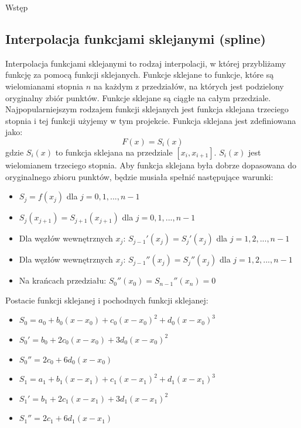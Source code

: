 \documentclass{article}
\begin{document}
\begin{section}{Wstęp}
  \subsection{Interpolacja funkcjami sklejanymi (spline)}
  Interpolacja funkcjami sklejanymi to rodzaj interpolacji, w której przybliżamy funkcję za pomocą funkcji sklejanych.
  Funkcje sklejane to funkcje, które są wielomianami stopnia $n$ na każdym z przedziałów, na których jest podzielony
  oryginalny zbiór punktów. Funkcje sklejane są ciągłe na całym przedziale.
  Najpopularniejszym rodzajem funkcji sklejanych jest funkcja sklejana trzeciego stopnia i tej funkcji użyjemy w tym
  projekcie. Funkcja sklejana jest zdefiniowana jako:
  \begin{equation}
    F(x) = S_{i}(x)
  \end{equation}
  gdzie $S_{i}(x)$ to funkcja sklejana na przedziale $[x_{i}, x_{i+1}]$. $S_{i}(x)$ jest wielomianem trzeciego stopnia.
  Aby funkcja sklejana była dobrze dopasowana do oryginalnego zbioru punktów, będzie musiała spełnić następujące warunki:
  \begin{itemize}
    \item $S_{j} = f(x_{j})$ dla $j = 0, 1, ..., n - 1$
    \item $S_{j}(x_{j+1}) = S_{j+1}(x_{j+1})$ dla $j = 0, 1, ..., n - 1$
    \item Dla węzłów wewnętrznych $x_{j}$: $S_{j-1}'(x_{j}) = S_{j}'(x_{j})$ dla $j = 1, 2, ..., n - 1$ 
    \item Dla węzłów wewnętrznych $x_{j}$: $S_{j-1}''(x_{j}) = S_{j}''(x_{j})$ dla $j = 1, 2, ..., n - 1$
    \item Na krańcach przedziału: $S_{0}''(x_{0}) = S_{n-1}''(x_{n}) = 0$
  \end{itemize}\cite{wyklad5}
  Postacie funkcji sklejanej i pochodnych funkcji sklejanej:
  \begin{itemize}
    \item $S_{0} = a_{0} + b_{0}(x - x_{0}) + c_{0}(x - x_{0})^{2} + d_{0}(x - x_{0})^{3}$
    \item $S_{0}' = b_{0} + 2c_{0}(x - x_{0}) + 3d_{0}(x - x_{0})^{2}$
    \item $S_{0}'' = 2c_{0} + 6d_{0}(x - x_{0})$
    \item $S_{1} = a_{1} + b_{1}(x - x_{1}) + c_{1}(x - x_{1})^{2} + d_{1}(x - x_{1})^{3}$
    \item $S_{1}' = b_{1} + 2c_{1}(x - x_{1}) + 3d_{1}(x - x_{1})^{2}$
    \item $S_{1}'' = 2c_{1} + 6d_{1}(x - x_{1})$

\end{itemize}
\end{section}
\end{document}
